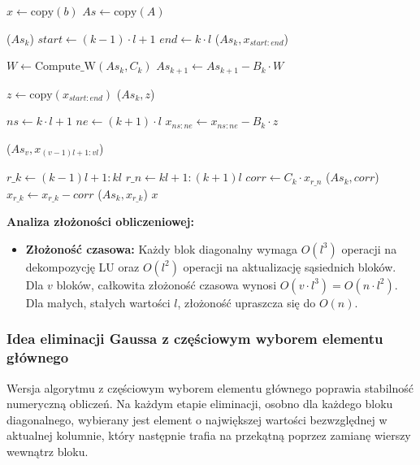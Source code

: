 \documentclass{article}
\begin{document}
\begin{algorithm}[H]
\caption{Eliminacja Gaussa dla macierzy blokowej (Zadanie 1a)}
\begin{algorithmic}[1]
    \State $x \gets \text{copy}(b)$
    \State $As \gets \text{copy}(A)$
    
    \State {}
        \State {}($As_{k}$)
        \State $start \gets (k-1) \cdot l + 1$
        \State $end \gets k \cdot l$
        \State {}($As_{k}, x_{start:end}$)
        
            \State $W \gets \text{Compute\_W}(As_{k}, C_{k})$
            \State $As_{k+1} \gets As_{k+1} - B_{k} \cdot W$
            
            \State $z \gets \text{copy}(x_{start:end})$
            \State {}($As_{k}, z$)
            
            \State $ns \gets k \cdot l + 1$
            \State $ne \gets (k+1) \cdot l$
            \State $x_{ns:ne} \gets x_{ns:ne} - B_{k} \cdot z$
        \EndIf
    \EndFor

    \State {}
    \State {}($As_{v}, x_{(v-1)l+1 : vl}$)
    
        \State $r\_k \gets (k-1)l+1 : kl$
        \State $r\_n \gets kl+1 : (k+1)l$
        \State $corr \gets C_{k} \cdot x_{r\_n}$
        \State {}($As_{k}, corr$)
        \State $x_{r\_k} \gets x_{r\_k} - corr$
        \State {}($As_{k}, x_{r\_k}$)
    \EndFor
    \State \Return $x$
\EndProcedure
\end{algorithmic}
\end{algorithm}
\textbf{Analiza złożoności obliczeniowej:}
\begin{itemize}
    \item \textbf{Złożoność czasowa:} Każdy blok diagonalny wymaga $O(l^3)$ operacji
    na dekompozycję LU oraz $O(l^2)$ operacji na aktualizację sąsiednich bloków.
    Dla $v$ bloków, całkowita złożoność czasowa wynosi $O(v \cdot l^3) = O(n
    \cdot l^2)$. Dla małych, stałych wartości $l$, złożoność upraszcza się do
    $O(n)$.
\end{itemize}

\subsubsection*{Idea eliminacji Gaussa z częściowym wyborem elementu głównego}
Wersja algorytmu z częściowym wyborem elementu głównego poprawia stabilność
numeryczną obliczeń. Na każdym etapie eliminacji, osobno dla każdego bloku
diagonalnego, wybierany jest element o największej wartości bezwzględnej w
aktualnej kolumnie, który następnie trafia na przekątną poprzez zamianę wierszy
wewnątrz bloku.
\end{document}
